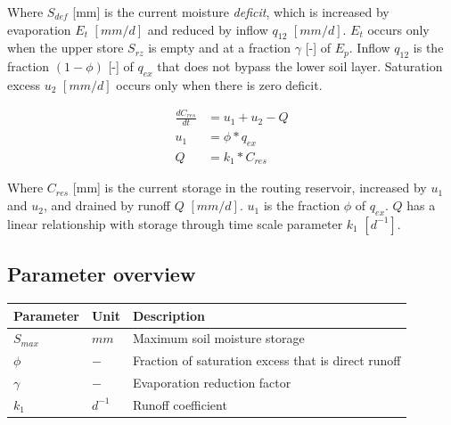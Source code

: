 Where $S_{def}$ [mm] is the current moisture \emph{deficit}, which is increased by evaporation $E_t$ $[mm/d]$ and reduced by inflow $q_{12}$ $[mm/d]$. 
$E_t$ occurs only when the upper store $S_{rz}$ is empty and at a fraction $\gamma$ [-] of $E_p$. 
Inflow $q_{12}$ is the fraction $(1-\phi)$ [-] of $q_{ex}$ that does not bypass the lower soil layer. 
Saturation excess $u_2$ $[mm/d]$ occurs only when there is zero deficit.

\begin{align}
	\frac{dC_{res}}{dt} &= u_1+u_2-Q\\
	u_1 &= \phi*q_{ex}\\
	Q &= k_1*C_{res}
\end{align}
  
Where $C_{res}$ [mm] is the current storage in the routing reservoir, increased by $u_1$ and $u_2$, and drained by runoff $Q$  $[mm/d]$. $u_1$ is the fraction $\phi$ of $q_{ex}$. $Q$ has a linear relationship with storage through time scale parameter $k_1$ $[d^{-1}]$.

\subsection{Parameter overview}

\begin{table}[htbp]
  \centering
    \begin{tabular}{lll}
    \toprule
    Parameter & Unit  & Description \\
    \midrule
    $S_{max}$ & $mm$  & Maximum soil moisture storage \\
    $\phi$ & $-$   & Fraction of saturation excess that is direct runoff \\
    $\gamma$ & $-$   & Evaporation reduction factor \\
    $k_1$ & $d^{-1}$ & Runoff coefficient \\
    \bottomrule
    \end{tabular}%
  \label{tab:addlabel}%
\end{table}%


